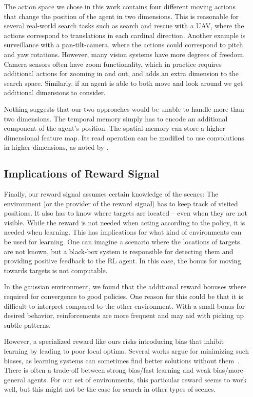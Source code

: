 The action space we chose in this work contains four different moving actions that change the position of the agent in two dimensions.
This is reasonable for several real-world search tasks such as search and rescue with a UAV, where the actions correspond to translations in each cardinal direction.
Another example is surveillance with a pan-tilt-camera, where the actions could correspond to pitch and yaw rotations.
However, many vision systems have more degrees of freedom.
Camera sensors often have zoom functionality, which in practice requires additional actions for zooming in and out, and adds an extra dimension to the search space.
Similarly, if an agent is able to both move and look around we get additional dimensions to consider.

Nothing suggests that our two approaches would be unable to handle more than two dimensions.
The temporal memory simply has to encode an additional component of the agent's position.
The spatial memory can store a higher dimensional feature map.
Its read operation can be modified to use convolutions in higher dimensions, as noted by \cite{parisotto_neural_2017}.

\subsection{Implications of Reward Signal}

Finally, our reward signal assumes certain knowledge of the scenes:
The environment (or the provider of the reward signal) has to keep track of visited positions.
It also has to know where targets are located -- even when they are not visible.
While the reward is not needed when acting according to the policy, it is needed when learning.
This has implications for what kind of environments can be used for learning.
One can imagine a scenario where the locations of targets are not known, but a black-box system is responsible for detecting them and providing positive feedback to the RL agent.
In this case, the bonus for moving towards targets is not computable.

In the gaussian environment, we found that the additional reward bonuses where required for convergence to good policies.
One reason for this could be that it is difficult to interpret compared to the other environment.
With a small bonus for desired behavior, reinforcements are more frequent and may aid with picking up subtle patterns.

However, a specialized reward like ours risks introducing bias that inhibit learning by leading to poor local optima.
Several works argue for minimizing such biases, as learning systems can sometimes find better solutions without them~\cite{hessel_inductive_2019}.
There is often a trade-off between strong bias/fast learning and weak bias/more general agents.
For our set of environments, this particular reward seems to work well, but this might not be the case for search in other types of scenes.

